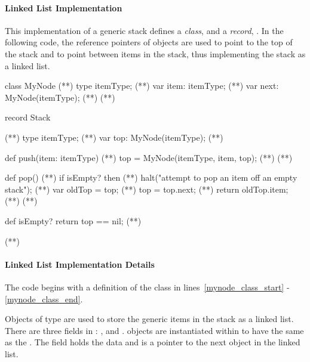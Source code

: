 \paragraph{Linked List Implementation}
This implementation of a generic stack defines a {\em class},
 and a {\em record}, .  In the following
code, the reference pointers of  objects are used to point to
the top of the stack and to point between items in the stack,
thus implementing the stack as a linked list.

\begin{numberedchapel}
class MyNode {                      (*\label{mynode_class_start}*)
  type itemType;                    (*\label{mynode_itemtype}*)
  var item: itemType;               (*\label{mynode_item}*)
  var next: MyNode(itemType);       (*\label{mynode_next}*)
}                                   (*\label{mynode_class_end}*)

record Stack {                      (*\label{stack_list_start}*)
  type itemType;                    (*\label{stack_list_itemtype}*)
  var top: MyNode(itemType);        (*\label{stack_list_top}*)

  def push(item: itemType) {        (*\label{stack_list_push_start}*)
    top = MyNode(itemType, item, top); (*\label{stack_list_push_top}*)
  }                                 (*\label{stack_list_push_end}*)

  def pop() {                       (*\label{stack_list_pop_start}*)
    if isEmpty? then                (*\label{stack_list_pop_empty_1}*)
      halt("attempt to pop an item off an empty stack"); (*\label{stack_list_empty_2}*)
    var oldTop = top;               (*\label{stack_list_pop_oldtop}*)
    top = top.next;                 (*\label{stack_list_pop_newtop}*)
    return oldTop.item;             (*\label{stack_list_pop_return}*)
  }                                 (*\label{stack_list_pop_end}*)

  def isEmpty? return top == nil;   (*\label{stack_list_isempty}*)
}                                  (*\label{stack_list_end}*)
\end{numberedchapel}

\paragraph{Linked List Implementation Details}
The code begins with a definition of the  class in 
lines~\ref{mynode_class_start} - \ref{mynode_class_end}.  
\begin{chapel}
class MyNode {                      
  type itemType;                   
  var item: itemType;             
  var next: MyNode(itemType);    
\end{chapel}
Objects of type  are used to store the generic items in the stack
as a linked list.  There are three fields in :  , 
 and
.   objects are instantiated within  to
have the same  as the .  The  field
holds the data and  is a pointer to the next  object
in the linked list.

